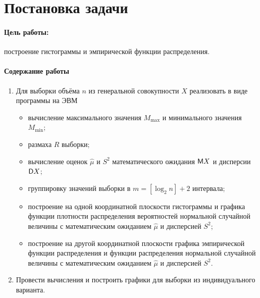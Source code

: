 
\section{Постановка задачи}

\paragraph{Цель работы:} построение гистограммы и эмпирической функции распределения.

\paragraph{Содержание работы}

\begin{enumerate}
    \item Для выборки объёма $n$ из генеральной совокупности $X$ реализовать в виде программы на ЭВМ
    \begin{itemize}
        \item вычисление максимального значения $M_{\max}$ и минимального значения $M_{\min}$;
        \item размаха $R$ выборки;
        \item вычисление оценок $\hat{\mu}$ и $S^2$ математического ожидания $\mathsf{M} X$ и дисперсии $\mathsf{D} X$;
        \item группировку значений выборки в $m = [\log_2 n] + 2$ интервала;
        \item построение на одной координатной плоскости гистограммы и графика функции плотности распределения вероятностей нормальной случайной величины с математическим ожиданием $\hat{\mu}$ и дисперсией $S^2$;
        \item построение на другой координатной плоскости графика эмпирической функции распределения и функции распределения нормальной случайной величины с математическим ожиданием $\hat{\mu}$ и дисперсией $S^2$.
    \end{itemize}
    \item Провести вычисления и построить графики для выборки из индивидуального варианта.
\end{enumerate}